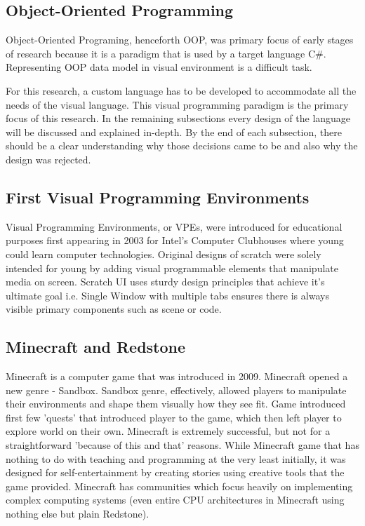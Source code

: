 \documentclass{article}
\begin{document}
\subsection{Object-Oriented Programming}
Object-Oriented Programing, henceforth OOP, was primary focus of early stages of research because it is a paradigm that is used by a target language C\#. Representing OOP data model in visual environment is a difficult task.

For this research, a custom language has to be developed to accommodate all the needs of the visual language. This visual programming paradigm is the primary focus of this research. In the remaining subsections every design of the language will be discussed and explained in-depth. By the end of each subsection, there should be a clear understanding why those decisions came to be and also why the design was rejected.

\subsection{First Visual Programming Environments}
Visual Programming Environments, or VPEs, were introduced for educational purposes first appearing in 2003 for Intel's Computer Clubhouses where young could learn computer technologies. Original designs of scratch were solely intended for young by adding visual programmable elements that manipulate media on screen.\cite{demrkiran_2021_an}
Scratch UI uses sturdy design principles that achieve it's ultimate goal i.e. Single Window with multiple tabs ensures there is always visible primary components such as scene or code.

\subsection{Minecraft and Redstone}
Minecraft is a computer game that was introduced in 2009. Minecraft opened a new genre - Sandbox. Sandbox genre, effectively, allowed players to manipulate their environments and shape them visually how they see fit. Game introduced first few 'quests' that introduced player to the game, which then left player to explore world on their own. Minecraft is extremely successful, but not for a straightforward 'because of this and that' reasons. \cite{baek_2020_mining}
While Minecraft game that has nothing to do with teaching and programming\cite{baek_2020_mining} at the very least initially, it was designed for self-entertainment by creating stories using creative tools that the game provided\cite{booch_2013_from}. Minecraft has communities which focus heavily on implementing complex computing systems (even entire CPU architectures in Minecraft using nothing else but plain Redstone).\cite{matteson_2017_a}
\end{document}
